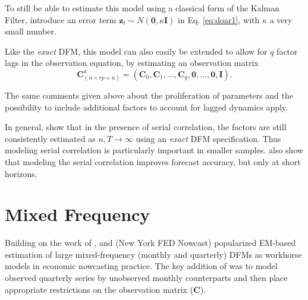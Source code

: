 \documentclass[a4paper]{article}
\begin{document}
To still be able to estimate this model using a classical form of the Kalman Filter, \citet{banbura2014maximum} introduce an error term $\textbf{z}_t \sim N(\textbf{0}, \kappa \textbf{I})$ in Eq. \ref{eq:doar1}, with $\kappa$ a very small number. \newline

Like the \emph{exact} DFM, this model can also easily be extended to allow for $q$ factor lags in the observation equation, by estimating an observation matrix
\begin{equation}
\textbf{C}^a_{(n \times rp+n)}  = (\textbf{C}_0, \textbf{C}_1, \dots, \textbf{C}_q, \textbf{0}, \dots, \textbf{0}, \textbf{I}).
\end{equation}

The same comments given above about the proliferation of parameters and the possibility to include additional factors to account for lagged dynamics apply. \newline 

In general, \citet{doz2011two, doz2012quasi} show that in the presence of serial correlation, the factors are still consistently estimated as $n, T \to \infty$ using an \emph{exact} DFM specification. Thus modeling serial correlation is particularly important in smaller samples. \citet{banbura2014maximum} also show that modeling the serial correlation improves forecast accuracy, but only at short horizons.

\newpage 

\section{Mixed Frequency}

Building on the work of \citet{mariano2003new}, \citet{banbura2014maximum} and \citet{bok2018macroeconomic} (New York FED Nowcast) popularized EM-based estimation of large mixed-frequency (monthly and quarterly) DFMs as workhorse models in economic nowcasting practice. The key addition of \citet{mariano2003new} was to model observed quarterly series by unobserved monthly counterparts and then place appropriate restrictions on the observation matrix (\textbf{C}). \newline 
\end{document}
